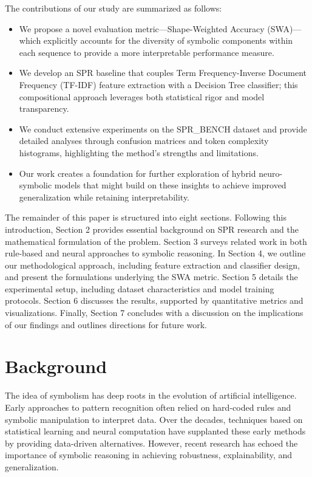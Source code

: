 \documentclass{article}
\begin{document}
The contributions of our study are summarized as follows:
\begin{itemize}
    \item We propose a novel evaluation metric—Shape-Weighted Accuracy (SWA)—which explicitly accounts for the diversity of symbolic components within each sequence to provide a more interpretable performance measure.
    \item We develop an SPR baseline that couples Term Frequency-Inverse Document Frequency (TF-IDF) feature extraction with a Decision Tree classifier; this compositional approach leverages both statistical rigor and model transparency.
    \item We conduct extensive experiments on the SPR\_BENCH dataset and provide detailed analyses through confusion matrices and token complexity histograms, highlighting the method’s strengths and limitations.
    \item Our work creates a foundation for further exploration of hybrid neuro-symbolic models that might build on these insights to achieve improved generalization while retaining interpretability.
\end{itemize}

The remainder of this paper is structured into eight sections. Following this introduction, Section 2 provides essential background on SPR research and the mathematical formulation of the problem. Section 3 surveys related work in both rule-based and neural approaches to symbolic reasoning. In Section 4, we outline our methodological approach, including feature extraction and classifier design, and present the formulations underlying the SWA metric. Section 5 details the experimental setup, including dataset characteristics and model training protocols. Section 6 discusses the results, supported by quantitative metrics and visualizations. Finally, Section 7 concludes with a discussion on the implications of our findings and outlines directions for future work.

\section{Background}
The idea of symbolism has deep roots in the evolution of artificial intelligence. Early approaches to pattern recognition often relied on hard-coded rules and symbolic manipulation to interpret data. Over the decades, techniques based on statistical learning and neural computation have supplanted these early methods by providing data-driven alternatives. However, recent research has echoed the importance of symbolic reasoning in achieving robustness, explainability, and generalization.
\end{document}
